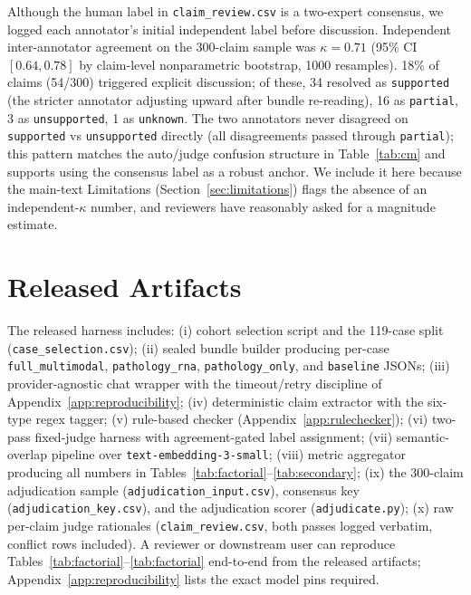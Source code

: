 \documentclass{article}
\theoremstyle{plain}
\begin{document}
Although the human label in \texttt{claim\_review.csv} is a two-expert consensus, we logged each annotator's initial independent label before discussion. Independent inter-annotator agreement on the 300-claim sample was $\kappa = 0.71$ (95\% CI $[0.64, 0.78]$ by claim-level nonparametric bootstrap, 1000 resamples). 18\% of claims (54/300) triggered explicit discussion; of these, 34 resolved as \texttt{supported} (the stricter annotator adjusting upward after bundle re-reading), 16 as \texttt{partial}, 3 as \texttt{unsupported}, 1 as \texttt{unknown}. The two annotators never disagreed on \texttt{supported} vs \texttt{unsupported} directly (all disagreements passed through \texttt{partial}); this pattern matches the auto/judge confusion structure in Table~\ref{tab:cm} and supports using the consensus label as a robust anchor. We include it here because the main-text Limitations (Section~\ref{sec:limitations}) flags the absence of an independent-$\kappa$ number, and reviewers have reasonably asked for a magnitude estimate.

\section{Released Artifacts}
\label{app:artifacts}

The released harness includes: (i) cohort selection script and the 119-case split (\texttt{case\_selection.csv}); (ii) sealed bundle builder producing per-case \texttt{full\_multimodal}, \texttt{pathology\_rna}, \texttt{pathology\_only}, and \texttt{baseline} JSONs; (iii) provider-agnostic chat wrapper with the timeout/retry discipline of Appendix~\ref{app:reproducibility}; (iv) deterministic claim extractor with the six-type regex tagger; (v) rule-based checker (Appendix~\ref{app:rulechecker}); (vi) two-pass fixed-judge harness with agreement-gated label assignment; (vii) semantic-overlap pipeline over \texttt{text-embedding-3-small}; (viii) metric aggregator producing all numbers in Tables~\ref{tab:factorial}--\ref{tab:secondary}; (ix) the 300-claim adjudication sample (\texttt{adjudication\_input.csv}), consensus key (\texttt{adjudication\_key.csv}), and the adjudication scorer (\texttt{adjudicate.py}); (x) raw per-claim judge rationales (\texttt{claim\_review.csv}, both passes logged verbatim, conflict rows included). A reviewer or downstream user can reproduce Tables~\ref{tab:factorial}--\ref{tab:factorial} end-to-end from the released artifacts; Appendix~\ref{app:reproducibility} lists the exact model pins required.
\end{document}
